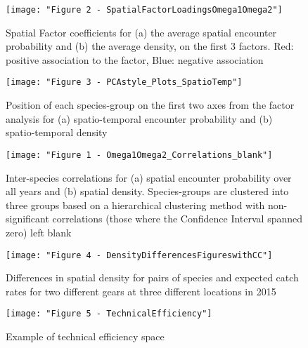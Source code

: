 \documentclass{nature}
\begin{document}


\begin{figure}
\begin{center}
	\texttt{[image: "Figure 2 - SpatialFactorLoadingsOmega1Omega2"]}
	\label{fig:1}
	\caption{Spatial Factor coefficients for (a) the average spatial encounter
		probability and (b) the average density,  on the first 3
		factors. Red: positive association to the factor, Blue:
		negative association}
\end{center}
\end{figure}


\begin{figure}
\begin{center}
	\texttt{[image: "Figure 3 - PCAstyle\_Plots\_SpatioTemp"]}
	\label{fig:2}
	\caption{Position of each species-group on the first two axes from the
		factor analysis for (a) spatio-temporal encounter probability
		and (b) spatio-temporal density}
\end{center}
\end{figure}

\begin{figure}
\begin{center}
	\texttt{[image: "Figure 1 - Omega1Omega2\_Correlations\_blank"]}
	\label{fig:3}
	\caption{Inter-species correlations for (a) spatial encounter
		probability over all years and (b) spatial density.
		Species-groups are clustered into three groups based on a
		hierarchical clustering method with non-significant
		correlations (those where the Confidence Interval spanned zero)
		left blank}
	\end{center}
\end{figure}

\begin{figure}
\begin{center}
	\texttt{[image: "Figure 4 - DensityDifferencesFigureswithCC"]}
	\label{fig:4}
	\caption{Differences in spatial density for pairs of species and
		expected catch rates for two different gears at three different
	locations in 2015}
\end{center}
\end{figure}

\begin{figure}
\begin{center}
	\texttt{[image: "Figure 5 - TechnicalEfficiency"]}
	\label{fig:5}
	\caption{Example of technical efficiency space}
\end{center}
\end{figure}
\end{document}
